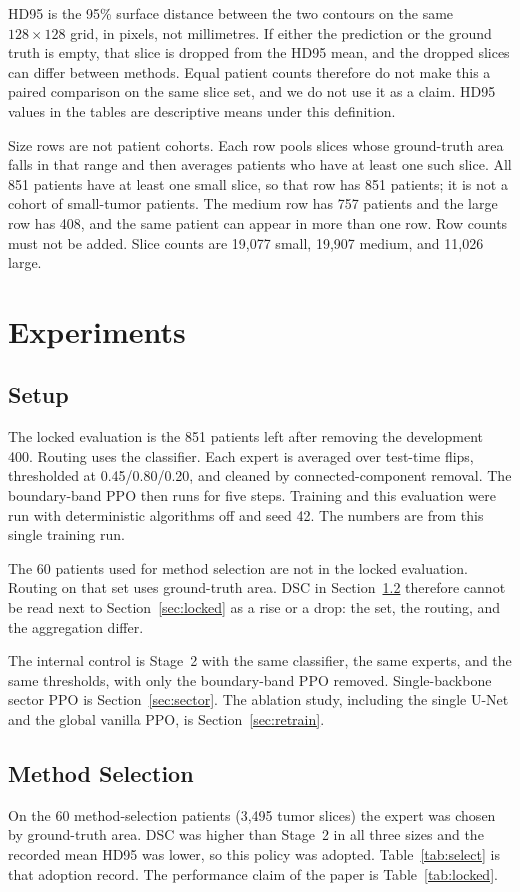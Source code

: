 \documentclass[runningheads]{llncs}
\begin{document}
HD95 is the 95\% surface distance between the two contours on the same $128\times128$ grid, in pixels, not millimetres. If either the prediction or the ground truth is empty, that slice is dropped from the HD95 mean, and the dropped slices can differ between methods. Equal patient counts therefore do not make this a paired comparison on the same slice set, and we do not use it as a claim. HD95 values in the tables are descriptive means under this definition.

Size rows are not patient cohorts. Each row pools slices whose ground-truth area falls in that range and then averages patients who have at least one such slice. All 851 patients have at least one small slice, so that row has 851 patients; it is not a cohort of small-tumor patients. The medium row has 757 patients and the large row has 408, and the same patient can appear in more than one row. Row counts must not be added. Slice counts are 19{,}077 small, 19{,}907 medium, and 11{,}026 large.

\section{Experiments}

\subsection{Setup}
The locked evaluation is the 851 patients left after removing the development 400. Routing uses the classifier. Each expert is averaged over test-time flips, thresholded at 0.45/0.80/0.20, and cleaned by connected-component removal. The boundary-band PPO then runs for five steps. Training and this evaluation were run with deterministic algorithms off and seed 42. The numbers are from this single training run.

The 60 patients used for method selection are not in the locked evaluation. Routing on that set uses ground-truth area. DSC in Section~\ref{sec:select} therefore cannot be read next to Section~\ref{sec:locked} as a rise or a drop: the set, the routing, and the aggregation differ.

The internal control is Stage~2 with the same classifier, the same experts, and the same thresholds, with only the boundary-band PPO removed. Single-backbone sector PPO is Section~\ref{sec:sector}. The ablation study, including the single U-Net and the global vanilla PPO, is Section~\ref{sec:retrain}.

\subsection{Method Selection}
\label{sec:select}
On the 60 method-selection patients (3{,}495 tumor slices) the expert was chosen by ground-truth area. DSC was higher than Stage~2 in all three sizes and the recorded mean HD95 was lower, so this policy was adopted. Table~\ref{tab:select} is that adoption record. The performance claim of the paper is Table~\ref{tab:locked}.
\end{document}

